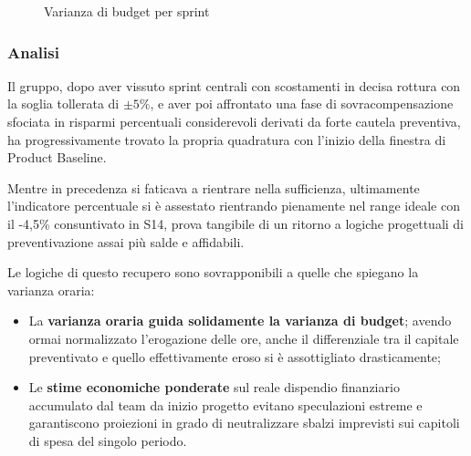 \documentclass[a4paper,11pt,oneside]{scrartcl}
\begin{document}
\begin{figure}[H]
\centering
{}
\caption{Varianza di budget per sprint}
\label{fig:varianza_budget}
\end{figure}

\subsubsection*{Analisi}

Il gruppo, dopo aver vissuto sprint centrali con scostamenti in decisa rottura con la soglia tollerata di $\pm 5\%$, e aver poi affrontato una fase di sovracompensazione sfociata in risparmi percentuali considerevoli derivati da forte cautela preventiva, ha progressivamente trovato la propria quadratura con l'inizio della finestra di Product Baseline. 

Mentre in precedenza si faticava a rientrare nella sufficienza, ultimamente l'indicatore percentuale si è assestato rientrando pienamente nel range ideale con il -4,5\% consuntivato in S14, prova tangibile di un ritorno a logiche progettuali di preventivazione assai più salde e affidabili.

Le logiche di questo recupero sono sovrapponibili a quelle che spiegano la varianza oraria:
\begin{itemize}
    \item La \textbf{varianza oraria guida solidamente la varianza di budget}; avendo ormai normalizzato l'erogazione delle ore, anche il differenziale tra il capitale preventivato e quello effettivamente eroso si è assottigliato drasticamente;
    \item Le \textbf{stime economiche ponderate} sul reale dispendio finanziario accumulato dal team da inizio progetto evitano speculazioni estreme e garantiscono proiezioni in grado di neutralizzare sbalzi imprevisti sui capitoli di spesa del singolo periodo.
\end{itemize}
\end{document}
